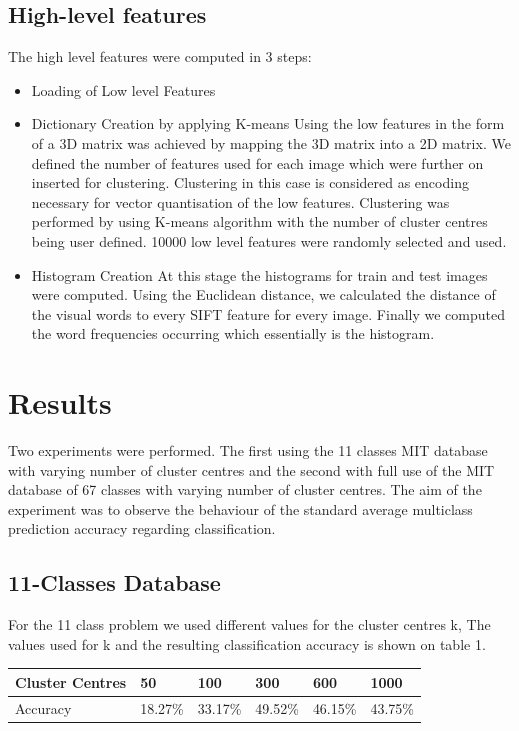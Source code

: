 \documentclass[10pt,twocolumn,letterpaper]{article}
\begin{document}
\subsection{High-level features}
The high level features were computed in 3 steps:
\begin{itemize}
   \item Loading of Low level Features 
   \item Dictionary Creation by applying K-means \newline
   Using the low features in the form of a 3D matrix was achieved by mapping the 3D matrix into a 2D matrix. We defined the number of features used for each image which were further on inserted for clustering. Clustering in this case is considered as encoding necessary for vector quantisation of the low features.  Clustering was performed by using K-means algorithm with the number of cluster centres being user defined. 10000 low level features were randomly selected and used.  
     
   \item Histogram Creation \newline
   At this stage the histograms for train and test images were computed. Using the Euclidean distance, we calculated the distance of the visual words to every SIFT feature  for every image. Finally we computed the word frequencies occurring which essentially is the histogram.
\end{itemize}

\section{Results}
Two experiments were performed. The first using the 11 classes MIT database with varying number of cluster centres and the second with full use of the MIT database of 67 classes with varying number of cluster centres. The aim of the experiment was to observe the behaviour of  the standard average multiclass prediction accuracy regarding classification. 
\subsection{11-Classes Database}
For the 11 class problem we used different values for the cluster centres k, The values used for k and the resulting classification accuracy is shown on table 1.
\begin{table}[h]
\begin{tabular}{|l|l|l|l|l|l|}
\hline
Cluster Centres & 50 & 100 & 300 & 600 & 1000 \\ \hline
Accuracy & 18.27\% & 33.17\% & 49.52\% & 46.15\% & 43.75\%  \\ \hline
\end{tabular}
\end{table}
\end{document}
